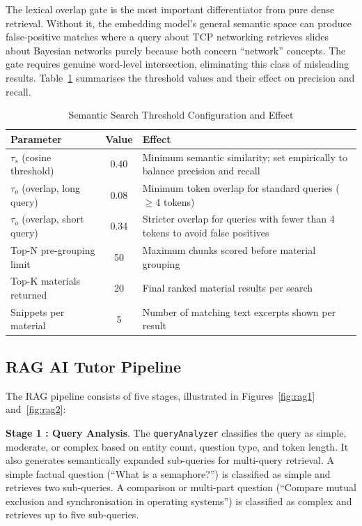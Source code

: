 \documentclass[12pt,a4paper]{report}
\begin{document}
The lexical overlap gate is the most important differentiator from pure dense retrieval. Without it, the embedding model's general semantic space can produce false-positive matches where a query about TCP networking retrieves slides about Bayesian networks purely because both concern ``network'' concepts. The gate requires genuine word-level intersection, eliminating this class of misleading results. Table~\ref{tab:search_thresholds} summarises the threshold values and their effect on precision and recall.

\begin{table}[htbp]
\caption{Semantic Search Threshold Configuration and Effect}
\label{tab:search_thresholds}
\centering
\small
\begin{tabularx}{\textwidth}{|l|c|X|}
\hline
\textbf{Parameter} & \textbf{Value} & \textbf{Effect} \\
\hline
$\tau_s$ (cosine threshold) & 0.40 & Minimum semantic similarity; set empirically to balance precision and recall \\
$\tau_o$ (overlap, long query) & 0.08 & Minimum token overlap for standard queries ($\geq$4 tokens) \\
$\tau_o$ (overlap, short query) & 0.34 & Stricter overlap for queries with fewer than 4 tokens to avoid false positives \\
Top-N pre-grouping limit & 50 & Maximum chunks scored before material grouping \\
Top-K materials returned & 20 & Final ranked material results per search \\
Snippets per material & 5 & Number of matching text excerpts shown per result \\
\hline
\end{tabularx}
\end{table}

\subsection{RAG AI Tutor Pipeline}

The RAG pipeline consists of five stages, illustrated in Figures~\ref{fig:rag1} and~\ref{fig:rag2}:

\textbf{Stage 1 : Query Analysis}. The \texttt{queryAnalyzer} classifies the query as simple, moderate, or complex based on entity count, question type, and token length. It also generates semantically expanded sub-queries for multi-query retrieval. A simple factual question (``What is a semaphore?'') is classified as simple and retrieves two sub-queries. A comparison or multi-part question (``Compare mutual exclusion and synchronisation in operating systems'') is classified as complex and retrieves up to five sub-queries.
\end{document}
